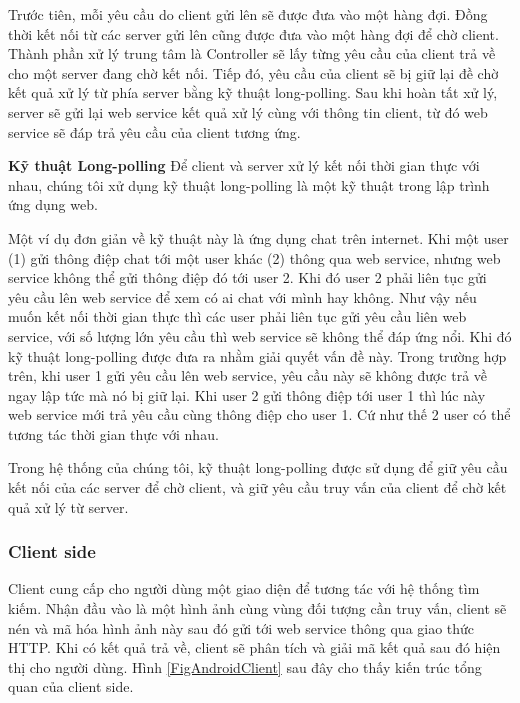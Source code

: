 {Trước tiên, mỗi yêu cầu do client gửi lên sẽ được đưa vào một hàng đợi. Đồng thời kết nối từ các server gửi lên cũng được đưa vào một hàng đợi để chờ client. Thành phần xử lý trung tâm là Controller sẽ lấy từng yêu cầu của client trả về cho một server đang chờ kết nối. Tiếp đó, yêu cầu của client sẽ bị giữ lại đề chờ kết quả xử lý từ phía server bằng kỹ thuật long-polling. Sau khi hoàn tất xử lý, server sẽ gửi lại web service kết quả xử lý cùng với thông tin client, từ đó web service sẽ đáp trả yêu cầu của client tương ứng.

\textbf{Kỹ thuật Long-polling}
Để client và server xử lý kết nối thời gian thực với nhau, chúng tôi xử dụng kỹ thuật long-polling là một kỹ thuật trong lập trình ứng dụng web.

Một ví dụ đơn giản về kỹ thuật này là ứng dụng chat trên internet. Khi một user (1) gửi thông điệp chat tới một user khác (2) thông qua web service, nhưng web service không thể gửi thông điệp đó tới user 2. Khi đó user 2 phải liên tục gửi yêu cầu lên web service để xem có ai chat với mình hay không. Như vậy nếu muốn kết nối thời gian thực thì các user phải liên tục gửi yêu cầu liên web service, với số lượng lớn yêu cầu thì web service sẽ không thể đáp ứng nổi. Khi đó kỹ thuật long-polling được đưa ra nhằm giải quyết vấn đề này. Trong trường hợp trên, khi user 1 gửi yêu cầu lên web service, yêu cầu này sẽ không được trả về ngay lập tức mà nó bị giữ lại. Khi user 2 gửi thông điệp tới user 1 thì lúc này web service mới trả yêu cầu cùng thông điệp cho user 1. Cứ như thế 2 user có thể tương tác thời gian thực với nhau.

Trong hệ thống của chúng tôi, kỹ thuật long-polling được sử dụng để giữ yêu cầu kết nối của các server để chờ client, và giữ yêu cầu truy vấn của client để chờ kết quả xử lý từ server.

\subsubsection{Client side}
Client cung cấp cho người dùng một giao diện để tương tác với hệ thống tìm kiếm. Nhận đầu vào là một hình ảnh cùng vùng đối tượng cần truy vấn, client sẽ nén và mã hóa hình ảnh này sau đó gửi tới web service thông qua giao thức HTTP. Khi có kết quả trả về, client sẽ phân tích và giải mã kết quả sau đó hiện thị cho người dùng. Hình \ref{FigAndroidClient} sau đây cho thấy kiến trúc tổng quan của client side. 

}
